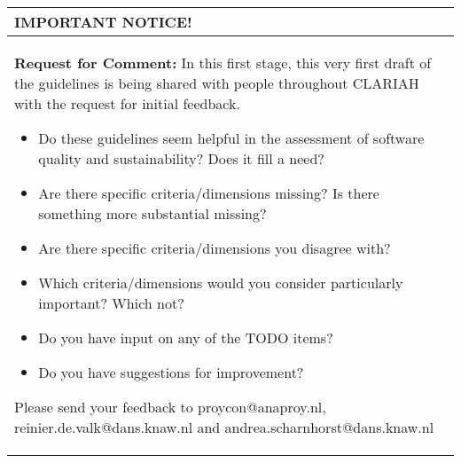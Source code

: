 \documentclass[a4paper,11pt]{article}
\newenvironment{notice}{
\begin{center}
    \begin{tabular}[h!]{|p{0.8\textwidth}|}
    \hline
    {\bf IMPORTANT NOTICE!}\\\hline}
{   \\\hline
    \end{tabular}
\end{center}}
\begin{document}
\begin{notice}
\textbf{Request for Comment:} In this first stage, this very first draft of the guidelines is being shared with
people throughout CLARIAH with the request for initial feedback. 
\begin{itemize}
    \item Do these guidelines seem helpful in the assessment of software
        quality and sustainability? Does it fill a need?
    \item Are there specific criteria/dimensions missing? Is there something more substantial missing?
    \item Are there specific criteria/dimensions you disagree with?
    \item Which criteria/dimensions would you consider particularly important?  Which not?
    \item Do you have input on any of the TODO items?
    \item Do you have suggestions for improvement?
\end{itemize}

Please send your feedback to proycon@anaproy.nl, reinier.de.valk@dans.knaw.nl and andrea.scharnhorst@dans.knaw.nl
\end{notice}




\end{document}
